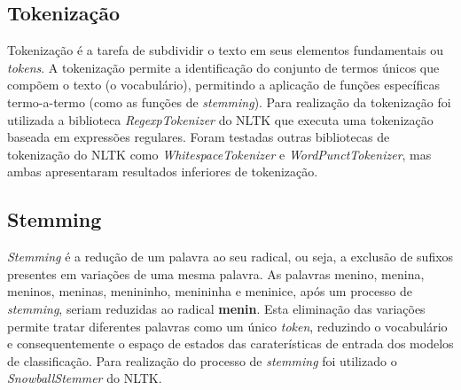 \subsection{Tokenização}

Tokenização é a tarefa de subdividir o texto em seus elementos fundamentais ou \textit{tokens}. A tokenização permite a identificação do conjunto de termos únicos que compõem o texto (o vocabulário), permitindo a aplicação de funções específicas termo-a-termo (como as funções de \textit{stemming}). Para realização da tokenização foi utilizada a biblioteca \textit{RegexpTokenizer} do NLTK que executa uma tokenização baseada em expressões regulares. Foram testadas outras bibliotecas de tokenização do NLTK como \textit{WhitespaceTokenizer} e \textit{WordPunctTokenizer}, mas ambas apresentaram resultados inferiores de tokenização.

\subsection{Stemming}

\textit{Stemming} é a redução de um palavra ao seu radical, ou seja, a exclusão de sufixos presentes em variações de uma mesma palavra. As palavras menino, menina, meninos,  meninas, menininho, menininha e meninice, após um processo de \textit{stemming}, seriam reduzidas ao radical \textbf{menin}. Esta eliminação das variações permite tratar diferentes palavras como um único \textit{token}, reduzindo o vocabulário e consequentemente o espaço de estados das caraterísticas de entrada dos modelos de classificação. Para realização do processo de \textit{stemming} foi utilizado o \textit{SnowballStemmer} do NLTK.